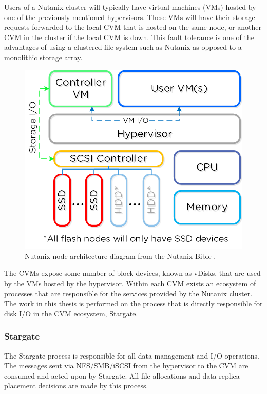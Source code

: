 \documentclass[12pt]{article}
\begin{document}
    Users of a Nutanix cluster will typically have virtual machines (VMs)
    hosted by one of the previously mentioned hypervisors. These VMs will have
    their storage requests forwarded to the local CVM that is hosted on the
    same node, or another CVM in the cluster if the local CVM is down. This
    fault tolerance is one of the advantages of using a clustered file system
    such as Nutanix as opposed to a monolithic storage array.
    
    \begin{figure}[htbp]
      \centering
      \includegraphics[scale=1.0]{images/converged_platform.png} 
      \caption{Nutanix node architecture diagram from the Nutanix
               Bible \cite{bible}.}
      \label{fig:adsf-architecture}
    \end{figure}

    The CVMs expose some number of block devices, known as vDisks, that are
    used by the VMs hosted by the hypervisor. Within each CVM exists an
    ecosystem of processes that are responsible for the services provided by
    the Nutanix cluster. The work in this thesis is performed on the process
    that is directly responsible for disk I/O in the CVM ecosystem, Stargate.

    \subsubsection{Stargate} \label{section-stargate}

    The Stargate process is responsible for all data management and I/O
    operations. The messages sent via NFS/SMB/iSCSI from the hypervisor to the
    CVM are consumed and acted upon by Stargate. All file allocations and data
    replica placement decisions are made by this process.
\end{document}

